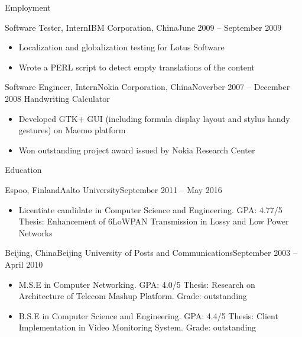 \documentclass[]{mcdowellcv}
\begin{document}
\begin{cvsection}{Employment}
		\begin{cvsubsection}{Software Tester, Intern}{IBM Corporation, China}{June 2009 -- September 2009}
			\begin{itemize}
				\item Localization and globalization testing for Lotus Software
				\item Wrote a PERL script to detect empty translations of the content
			\end{itemize}
		\end{cvsubsection}
				
		\begin{cvsubsection}{Software Engineer, Intern}{Nokia Corporation, China}{Noverber 2007 -- December 2008}
			Handwriting Calculator
			\begin{itemize}
				\item Developed GTK+ GUI (including formula display layout and stylus handy gestures) on Maemo platform
				\item Won outstanding project award issued by Nokia Research Center 
			\end{itemize}
		\end{cvsubsection}
	\end{cvsection}
	
	\begin{cvsection}{Education}
		\begin{cvsubsection}{Espoo, Finland}{Aalto University}{September 2011 -- May 2016}
			\begin{itemize}
				\item Licentiate candidate in Computer Science and Engineering. GPA: 4.77/5 \newline
				Thesis: Enhancement of 6LoWPAN Transmission in Lossy and Low Power Networks
			\end{itemize}
		\end{cvsubsection}

		\begin{cvsubsection}{Beijing, China}{Beijing University of Posts and Communications}{September 2003 --  April 2010}
			\vspace{0.2cm}
			\begin{itemize}
				\item M.S.E in Computer Networking. GPA: 4.0/5 \newline
				 Thesis: Research on Architecture of Telecom Mashup Platform. Grade: outstanding
				\item B.S.E in Computer Science and Engineering. GPA: 4.4/5 \newline
				Thesis: Client Implementation in Video Monitoring System. Grade: outstanding
			\end{itemize}
		\end{cvsubsection}
	\end{cvsection}
	
\end{document}
